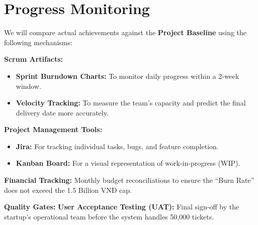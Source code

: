 \section{Progress Monitoring}

We will compare actual achievements against the \textbf{Project Baseline} using the following mechanisms:

\textbf{Scrum Artifacts:}
\begin{itemize}
    \item \textbf{Sprint Burndown Charts:} To monitor daily progress within a 2-week window.
    \item \textbf{Velocity Tracking:} To measure the team's capacity and predict the final delivery date more accurately.
\end{itemize}

\textbf{Project Management Tools:}
\begin{itemize}
    \item \textbf{Jira:} For tracking individual tasks, bugs, and feature completion.
    \item \textbf{Kanban Board:} For a visual representation of work-in-progress (WIP).
\end{itemize}

\textbf{Financial Tracking:} Monthly budget reconciliations to ensure the ``Burn Rate'' does not exceed the 1.5 Billion VNĐ cap.

\textbf{Quality Gates:} \textbf{User Acceptance Testing (UAT):} Final sign-off by the startup’s operational team before the system handles 50,000 tickets.